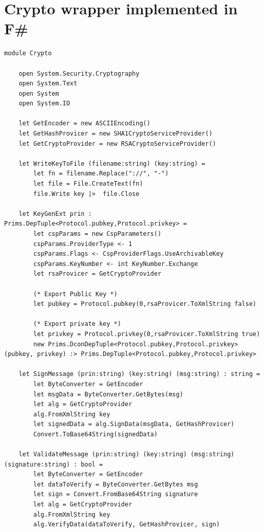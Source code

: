 \documentclass[twosided]{report}
\begin{document}
\section{Crypto wrapper implemented in F\#}
\begin{lstlisting}[style=fstar, caption={Example of implementation of crypto functions in F\# \cite{jacob}.}]
	module Crypto

	open System.Security.Cryptography
	open System.Text
	open System
	open System.IO
	
	let GetEncoder = new ASCIIEncoding()
	let GetHashProvicer = new SHA1CryptoServiceProvider()
	let GetCryptoProvider = new RSACryptoServiceProvider()
	
	let WriteKeyToFile (filename:string) (key:string) = 
		let fn = filename.Replace("://", "-")
		let file = File.CreateText(fn)
		file.Write key |>  file.Close
	
	let KeyGenExt prin : Prims.DepTuple<Protocol.pubkey,Protocol.privkey> = 
		let cspParams = new CspParameters()
		cspParams.ProviderType <- 1
		cspParams.Flags <- CspProviderFlags.UseArchivableKey
		cspParams.KeyNumber <- int KeyNumber.Exchange
		let rsaProvicer = GetCryptoProvider
	
		(* Export Public Key *)
		let pubkey = Protocol.pubkey(0,rsaProvicer.ToXmlString false)
	
		(* Export private key *)
		let privkey = Protocol.privkey(0,rsaProvicer.ToXmlString true)
		new Prims.DconDepTuple<Protocol.pubkey,Protocol.privkey>(pubkey, privkey) :> Prims.DepTuple<Protocol.pubkey,Protocol.privkey>
	
	let SignMessage (prin:string) (key:string) (msg:string) : string = 
		let ByteConverter = GetEncoder
		let msgData = ByteConverter.GetBytes(msg)
		let alg = GetCryptoProvider
		alg.FromXmlString key
		let signedData = alg.SignData(msgData, GetHashProvicer)
		Convert.ToBase64String(signedData)
	
	let ValidateMessage (prin:string) (key:string) (msg:string) (signature:string) : bool = 
		let ByteConverter = GetEncoder
		let dataToVerify = ByteConverter.GetBytes msg
		let sign = Convert.FromBase64String signature
		let alg = GetCryptoProvider
		alg.FromXmlString key
		alg.VerifyData(dataToVerify, GetHashProvicer, sign)
\end{lstlisting}
\clearpage
\end{document}
